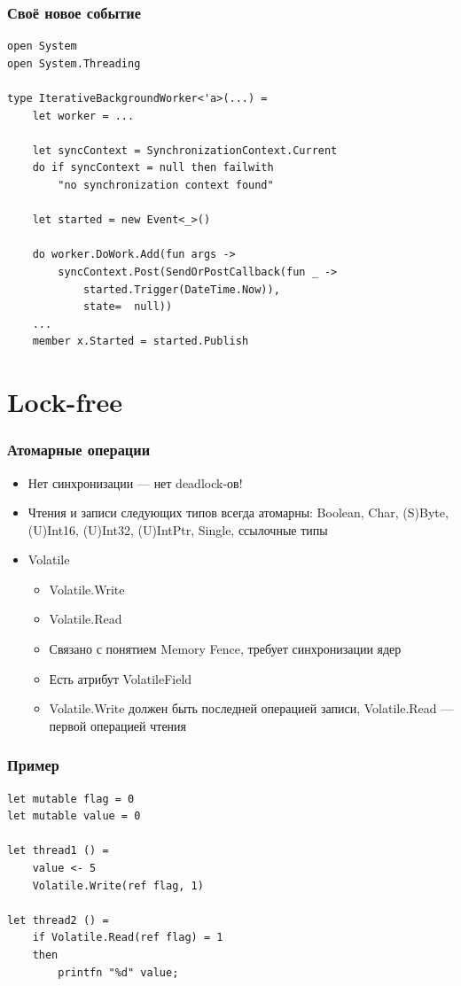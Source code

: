 \documentclass[xetex,mathserif,serif]{beamer}
\begin{document}
	\begin{frame}[fragile]
		\frametitle{Своё новое событие}
		\begin{footnotesize}
			\begin{verbatim}
open System
open System.Threading

type IterativeBackgroundWorker<'a>(...) =
    let worker = ...

    let syncContext = SynchronizationContext.Current
    do if syncContext = null then failwith 
        "no synchronization context found"
    
    let started = new Event<_>()

    do worker.DoWork.Add(fun args ->
        syncContext.Post(SendOrPostCallback(fun _ -> 
            started.Trigger(DateTime.Now)),
            state=  null))
    ...
    member x.Started = started.Publish
			\end{verbatim}
		\end{footnotesize}
	\end{frame}

	\section{Lock-free}

	\begin{frame}
		\frametitle{Атомарные операции}
		\begin{itemize}
			\item Нет синхронизации --- нет deadlock-ов!
			\item Чтения и записи следующих типов всегда атомарны: Boolean, Char, (S)Byte, (U)Int16, (U)Int32, (U)IntPtr, Single, ссылочные типы
			\item Volatile
			\begin{itemize}
				\item Volatile.Write
				\item Volatile.Read
				\item Связано с понятием Memory Fence, требует синхронизации ядер
				\item Есть атрибут VolatileField
				\item Volatile.Write должен быть последней операцией записи, Volatile.Read --- первой операцией чтения
			\end{itemize}
		\end{itemize}
	\end{frame}

	\begin{frame}[fragile]
		\frametitle{Пример}
		\begin{verbatim}
let mutable flag = 0
let mutable value = 0

let thread1 () = 
    value <- 5
    Volatile.Write(ref flag, 1)

let thread2 () =
    if Volatile.Read(ref flag) = 1 
    then
        printfn "%d" value;
		\end{verbatim}
	\end{frame}
\end{document}

